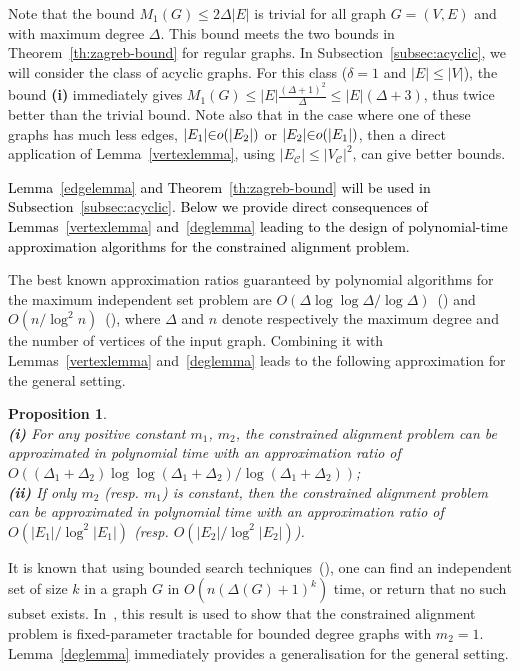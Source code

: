 \documentclass[final]{dmtcs-episciences}
\newtheorem{proposition}[theorem]{Proposition}
\newcommand\mar[1]{\textcolor{black}{#1}}
\begin{document}
Note that the bound $M_1(G)\leq 2\Delta|E|$ is trivial for all graph $G=(V,E)$ and with maximum degree $\Delta$. This bound meets the two bounds in Theorem~\ref{th:zagreb-bound} for regular graphs. In Subsection~\ref{subsec:acyclic}, we will consider the class of acyclic graphs. For this class ($\delta=1$ and $|E|\leq |V|$), the bound \textbf{ (i)} immediately gives $M_1(G)\leq |E|\frac{(\Delta+1)^2}{\Delta} \leq |E|(\Delta +3)$, thus twice better than the trivial bound. Note also that in the case where one of these graphs has much less edges,  $|E_1|\mar{\in} o(|E_2|)$ or $|E_2|\mar{\in} o(|E_1|)$, then a direct application of Lemma~\ref{vertexlemma}, using  $|E_\mathcal{C}|\leq |V_\mathcal{C}|^2$, can give better bounds. 

\mar{Lemma~\ref{edgelemma}  and Theorem~\ref{th:zagreb-bound} will be used in Subsection~\ref{subsec:acyclic}. Below we provide direct consequences of Lemmas~\ref{vertexlemma} and~\ref{deglemma} leading to the design of polynomial-time approximation algorithms for the constrained alignment problem.}





The best known approximation ratios guaranteed by polynomial algorithms   for the maximum independent set problem are  $O(\Delta\log \log\Delta/\log \Delta)$~(\citet{approx-stable}) and $O(n/\log^2 n)$~(\citet{Boppana92}), where $\Delta$ and $n$ denote respectively the maximum degree and the number of vertices of the input graph. 
Combining it with
Lemmas~\ref{vertexlemma} and~\ref{deglemma}   leads to the following approximation for the general setting.

\begin{proposition}\label{prop:generalapprox}\mbox{}\\
\textbf{ (i)} For any positive constant $m_1$, $m_2$, 
the constrained alignment problem can be approximated in polynomial time with an approximation ratio of
$O((\Delta_1+\Delta_2)\log \log(\Delta_1+\Delta_2)/\log(\Delta_1+\Delta_2))$;\\
\textbf{ (ii)} If only $m_2$ (resp. $m_1$) is constant, then the constrained alignment problem can be approximated in polynomial time with an approximation ratio of
$O(|E_1|/\log^2|E_1|)$ (resp. $O(|E_2|/\log^2|E_2|)$).
\end{proposition}

It is known that using bounded search techniques~(\citet{ParameterizedComplexity}),
one can find an independent set of size $k$ in a graph $G$ in $O(n(\Delta(G)+1)^k)$ time, or return that no such subset exists.
In~\citet{Fertin200990}, this result  is used to show that the constrained alignment problem is fixed-parameter tractable for bounded degree graphs with $m_2=1$. Lemma~\ref{deglemma} immediately provides a generalisation for the general setting.
\end{document}
